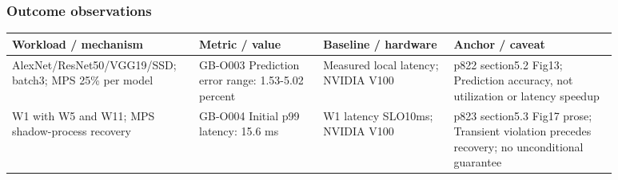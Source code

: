 \documentclass[12pt,a4paper]{article}
\begin{document}
\subsubsection*{Outcome observations}
\begin{longtable}{p{0.24\linewidth}p{0.19\linewidth}p{0.2\linewidth}p{0.25\linewidth}}
\toprule
Workload /\allowbreak{} mechanism & Metric /\allowbreak{} value & Baseline /\allowbreak{} hardware & Anchor /\allowbreak{} caveat\\\midrule
\endhead
AlexNet/\allowbreak{}ResNet50/\allowbreak{}VGG19/\allowbreak{}SSD; batch3; MPS 25\% per model & GB-O003 Prediction error range: 1.53-5.02 percent & Measured local latency; NVIDIA V100 & p822 section5.2 Fig13; Prediction accuracy, not utilization or latency speedup\\
W1 with W5 and W11; MPS shadow-process recovery & GB-O004 Initial p99 latency: 15.6 ms & W1 latency SLO10ms; NVIDIA V100 & p823 section5.3 Fig17 prose; Transient violation precedes recovery; no unconditional guarantee\\
\bottomrule
\end{longtable}
\end{document}
